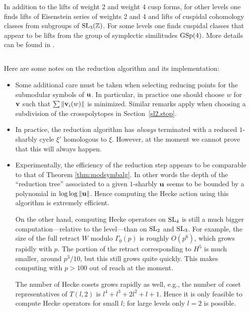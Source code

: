 In addition to the lifts of weight 2 and weight 4 cusp forms, for
other levels one finds lifts of Eisenstein series of weights 2 and 4
and lifts of cuspidal cohomology classes from subgroups of $\operatorname{SL}_{3}
(\mathbb{Z})$.  For some levels one finds cuspidal classes that appear to be
lifts from the group of symplectic similitudes $\operatorname{GSp} (4)$.  More
details can be found in \cite{computation, computationII}.

\subsection{}
%
Here are some notes on the reduction algorithm and its implementation:
\begin{itemize}
\item Some additional care must be taken when selecting reducing
points for the submodular symbols of ${\mathbf {u}}$.  In particular, in
practice one should choose $w$ for ${\mathbf {v}}$ such that $\sum \| {\mathbf {v}}_{i}
(w)\|$ is minimized.  Similar remarks apply when choosing a
subdivision of the crosspolytopes in Section~\ref{sl2.stop}.
\item In practice, the reduction algorithm has \emph{always} terminated with
a reduced $1$-sharbly cycle $\xi '$ homologous to $\xi$.  However, at
the moment we cannot prove that this will always happen.
\item Experimentally, the efficiency of the reduction step appears to
be comparable to that of Theorem \ref{thm:modsymbalg}.  In other words
the depth of the ``reduction tree'' associated to a given $1$-sharbly
${\mathbf {u}}$ seems to be bounded by a polynomial in $\log \log \| {\mathbf {u}} \| $.  Hence
computing the Hecke action using this algorithm is extremely
efficient.

On the other hand, computing Hecke operators on $\operatorname{SL}_{4}$ is still a
much bigger computation---relative to the level---than on $\operatorname{SL}_{2}$
and $\operatorname{SL}_{3}$.  For example, the size of the full retract $W$ modulo
$\Gamma_{0} (p)$ is roughly $O (p^{6})$, which grows rapidly with $p$.
The portion of the retract corresponding to $H^{5}$ is much smaller,
around $p^{3}/10$, but this still grows quite quickly.  This makes
computing with $p>100$ out of reach at the moment.

The number of Hecke cosets grows rapidly as well, e.g., the number of
coset representatives of $T (l,2)$ is $l^{4}+l^{3}+2l^{2}+l+1$.  Hence
it is only feasible to compute Hecke operators for small $l$; for
large levels only $l=2$ is possible.


\end{itemize}
